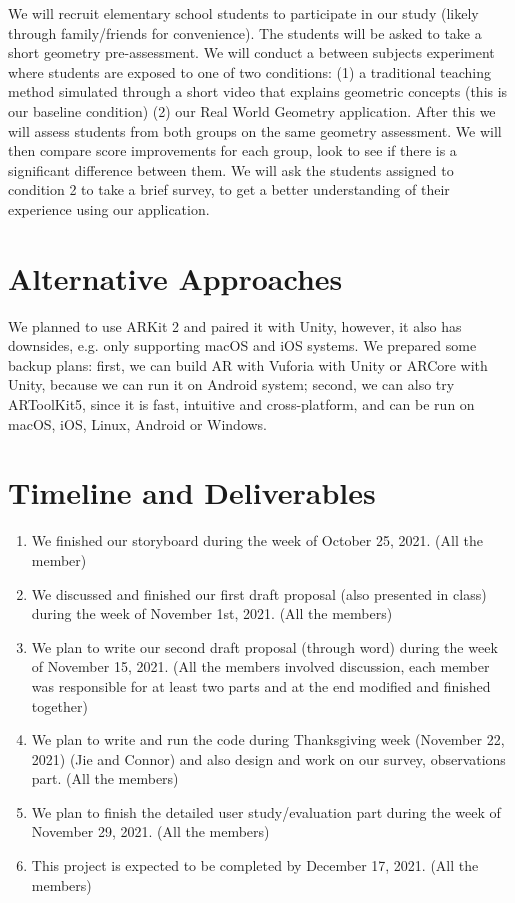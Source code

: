 \documentclass[acmsmall, nonacm]{acmart}
\begin{document}
We will recruit elementary school students to participate in our study (likely
through family/friends for convenience). The students will be asked to take a
short geometry pre-assessment. We will conduct a between subjects experiment
where students are exposed to one of two conditions: (1) a traditional teaching
method simulated through a short video that explains geometric concepts (this is
our baseline condition) (2) our Real World Geometry application. After this we
will assess students from both groups on the same geometry assessment. We will
then compare score improvements for each group, look to see if there is a
significant difference between them. We will ask the students assigned to
condition 2 to take a brief survey, to get a better understanding of their
experience using our application.

\section{Alternative Approaches}

We planned to use ARKit 2 and paired it with Unity, however, it also has
downsides, e.g. only supporting macOS and iOS systems. We prepared some backup
plans: first, we can build AR with Vuforia with Unity or ARCore with Unity,
because we can run it on Android system; second, we can also try ARToolKit5,
since it is fast, intuitive and cross-platform, and can be run on macOS, iOS,
Linux, Android or Windows.

\section{Timeline and Deliverables}

\begin{enumerate}
    \item We finished our storyboard during the week of October 25, 2021. (All the
    member)
    \item We discussed and finished our first draft proposal (also presented in
    class) during the week of November 1st, 2021. (All the members)
    \item We plan to write our second draft proposal (through word) during the week
    of November 15, 2021. (All the members involved discussion, each member was
    responsible for at least two parts and at the end modified and finished
    together)
    \item We plan to write and run the code during Thanksgiving week (November 22,
    2021) (Jie and Connor) and also design and work on our survey, observations
    part. (All the members)
    \item We plan to finish the detailed user study/evaluation part during the week
    of November 29, 2021. (All the members)
    \item This project is expected to be completed by December 17, 2021. (All the
    members)
\end{enumerate}
\end{document}
